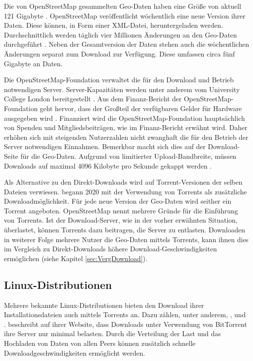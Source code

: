 Die von OpenStreetMap gesammelten Geo-Daten haben eine Größe von aktuell 121 Gigabyte \parencite{osmPlanet}. OpenStreetMap veröffentlicht wöchentlich eine neue Version ihrer Daten. Diese können, in Form einer XML-Datei, heruntergeladen werden. Durchschnittlich werden täglich vier Millionen Änderungen an den Geo-Daten durchgeführt \parencite{osmStats}. Neben der Gesamtversion der Daten stehen auch die wöchentlichen Änderungen separat zum Download zur Verfügung. Diese umfassen circa fünf Gigabyte an Daten. 

Die OpenStreetMap-Foundation verwaltet die für den Download und Betrieb notwendigen Server. Server-Kapazitäten werden unter anderem vom University College London bereitgestellt \parencite{osmHardware}. Aus dem Finanz-Be\-richt der OpenStreet\-Map-Foundation geht hervor, dass der Großteil der verfügbaren Gelder für Hardware ausgegeben wird \parencite{osmFinances}. Finanziert wird die Open\-Street\-Map-Foun\-dation hauptsächlich von Spenden und Mitgliedsbeiträgen, wie im Finanz-Be\-richt erwähnt wird. Daher erhöhen sich mit steigenden Nutzerzahlen nicht zwanghaft die für den Betrieb der Server notwendigen Einnahmen. Bemerkbar macht sich dies auf der Download-Seite für die Geo-Daten. Aufgrund von limitierter Upload-Bandbreite, müssen Downloads auf maximal 4096 Kilobyte pro Sekunde gekappt werden \parencite{osmPlanetWarning}. 

Als Alternative zu den Direkt-Downloads wird auf Torrent-Versionen der selben Dateien verwiesen. \textcite{osmPlanetTorrent} begann 2020 mit der Verwendung von Torrents als zusätzliche Downloadmöglichkeit. Für jede neue Version der Geo-Daten wird seither ein Torrent angeboten. OpenStreetMap nennt mehrere Gründe für die Einführung von Torrents. Ist der Download-Server, wie in der vorher erwähnten Situation, überlastet, können Torrents dazu beitragen, die Server zu entlasten. Downloaden in weiterer Folge mehrere Nutzer die Geo-Daten mittels Torrents, kann ihnen dies im Vergleich zu Direkt-Downloads höhere Download-Geschwindigkeiten ermöglichen (siehe Kapitel \ref{sec:VergDownload}). 


\subsection{Linux-Distributionen}
 
Mehrere bekannte Linux-Distributionen bieten den Download ihrer Installationsdateien auch mittels Torrents an. Dazu zählen, unter anderem, \textcite{debianTorrent}, \textcite{ubuntuTorrent} und \textcite{centOSTorrent}. \textcite{debianTorrent} beschreibt auf ihrer Website, dass Downloads unter Verwendung von BitTorrent ihre Server nur minimal belasten. Durch die Verteilung der Last und das Hochladen von Daten von allen Peers können zusätzlich schnelle Downloadgeschwindigkeiten ermöglicht werden. 


